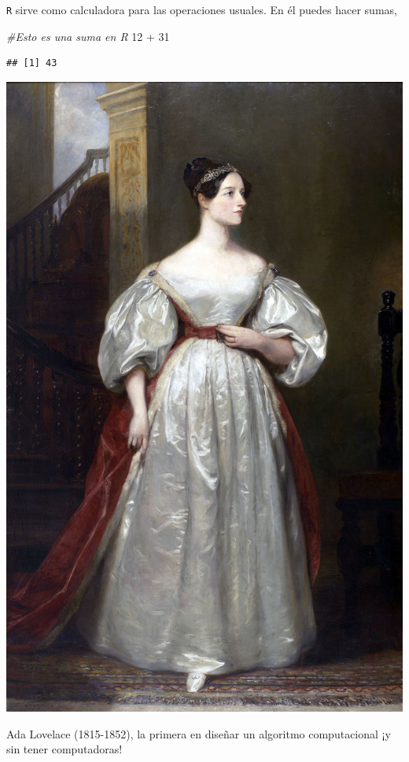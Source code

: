 \documentclass[]{tufte-book}
\newenvironment{Shaded}{}{}
\newcommand{\CommentTok}[1]{\textcolor[rgb]{0.38,0.63,0.69}{\textit{#1}}}
\newcommand{\DecValTok}[1]{\textcolor[rgb]{0.25,0.63,0.44}{#1}}
\newcommand{\SpecialCharTok}[1]{\textcolor[rgb]{0.25,0.44,0.63}{#1}}
\begin{document}
\texttt{R} sirve como calculadora para las operaciones usuales. En él
puedes hacer sumas,

\begin{Shaded}
\begin{Highlighting}[]
\CommentTok{\#Esto es una suma en R}
\DecValTok{12} \SpecialCharTok{+} \DecValTok{31}
\end{Highlighting}
\end{Shaded}

\begin{verbatim}
## [1] 43
\end{verbatim}

\begin{marginfigure}
\includegraphics[width=14.22in]{images/ada_lovelace} \caption[Ada Lovelace (1815-1852), la primera en diseñar un algoritmo computacional ¡y sin tener computadoras!]{Ada Lovelace (1815-1852), la primera en diseñar un algoritmo computacional ¡y sin tener computadoras!}\label{fig:unnamed-chunk-23}
\end{marginfigure}
\end{document}
